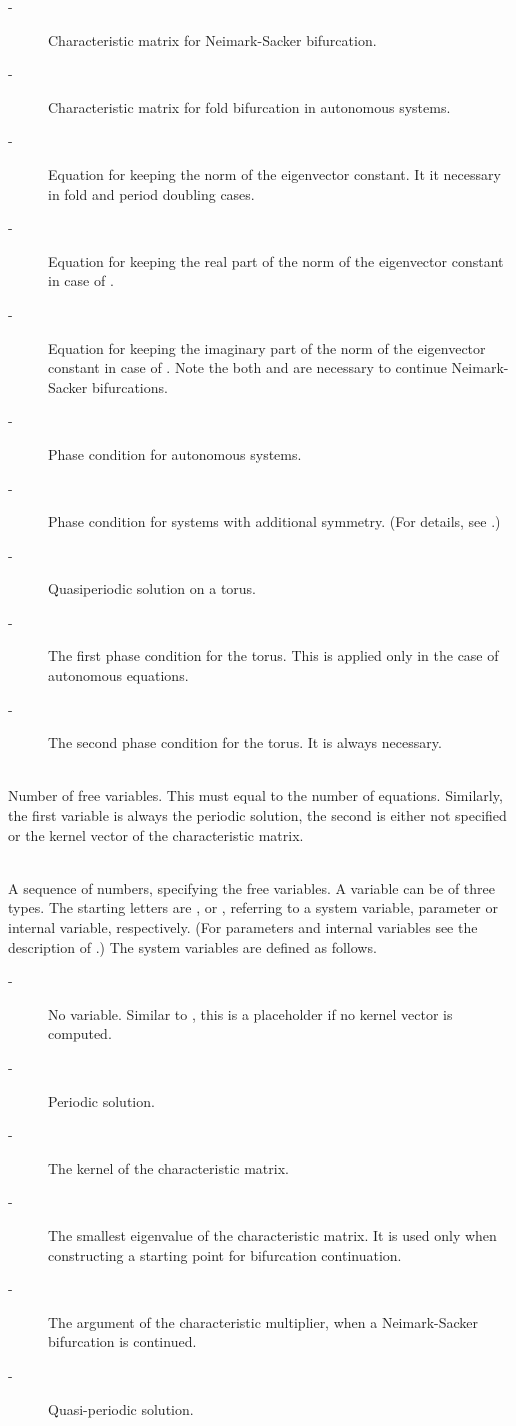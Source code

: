 \documentclass[10pt,a4paper]{ddedoc}
\begin{document}
\begin{description}
\begin{description}
\item[ -] Characteristic matrix for Neimark-Sacker bifurcation.
\item[ -] Characteristic matrix for fold bifurcation in autonomous systems.
\item[ -] Equation for keeping the norm of the eigenvector constant. It it necessary in fold and period doubling cases.
\item[ -] Equation for keeping the real part of the norm of the eigenvector constant in case of .
\item[ -] Equation for keeping the imaginary part of the norm of the eigenvector constant in case of . Note the both  and  are necessary to continue Neimark-Sacker bifurcations.
\item[ -] Phase condition for autonomous systems.
\item[ -] Phase condition for systems with additional symmetry. (For details, see \cite{haegeman}.)
\item[ -] Quasiperiodic solution on a torus.
\item[ -] The first phase condition for the torus. This is applied only in the case of autonomous equations.
\item[ -] The second phase condition for the torus. It is always necessary.
\end{description}
\item[\funp{NVAR}] ~\\
	Number of free variables. This must equal to the number of equations. Similarly, the first variable is always the periodic solution, the second is either not specified or the kernel vector of the characteristic matrix.
\item[\funp{VAR}] ~\\
	A sequence of numbers, specifying the free variables. A variable can be of three types. The starting letters are ,  or , referring to a system variable, parameter or internal variable, respectively. (For parameters and internal variables see the description of .) The system variables are defined as follows.
\begin{description}
\item[ -] No variable. Similar to , this is a placeholder if no kernel vector is computed.
\item[ -] Periodic solution.
\item[ -] The kernel of the characteristic matrix.
\item[ -] The smallest eigenvalue of the characteristic matrix.
It is used only when constructing a starting point for bifurcation continuation.
\item[ -] The argument of the characteristic multiplier, when a Neimark-Sacker bifurcation is continued.
\item[ -] Quasi-periodic solution.
\end{description}
\end{description}
\end{document}
